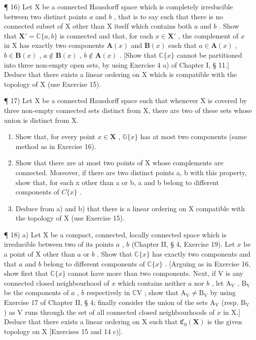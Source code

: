 ¶ 16) Let X be a connected Hausdorff space which is completely irreducible between two distinct points \(a\) and \(b\) , that is to say such that there is no connected subset of X other than X itself which contains both \(a\) and \(b\) . Show that \(\mathbf{X}' = \mathbb{C}\{a, b\}\) is connected and that, for each \(x \in \mathbf{X}'\) , the complement of \(x\) in X has exactly two components \(\mathbf{A}(x)\) and \(\mathbf{B}(x)\) such that \(a \in \mathbf{A}(x)\) , \(b \in \mathbf{B}(x)\) , \(a \notin \mathbf{B}(x)\) , \(b \notin \mathbf{A}(x)\) . {[}Show that \(\mathbb{C}\{x\}\) cannot be partitioned into three non-empty open sets, by using Exercise 4 a) of Chapter I, § 11.{]} Deduce that there exists a linear ordering on X which is compatible with the topology of X (use Exercise 15).

¶ 17) Let X be a connected Hausdorff space such that whenever X is covered by three non-empty connected sets distinct from X, there are two of these sets whose union is distinct from X.

\begin{enumerate}
\def\labelenumi{\alph{enumi})}
\item
  Show that, for every point \(x \in \mathbf{X}\) , \(\mathbb{G}\{x\}\) has at most two components (same method as in Exercise 16).
\item
  Show that there are at most two points of X whose complements are connected. Moreover, if there are two distinct points a, b with this property, show that, for each x other than a or b, a and b belong to different components of \(C\{x\}\) .
\item
  Deduce from a) and b) that there is a linear ordering on X compatible with the topology of X (use Exercise 15).
\end{enumerate}

¶ 18) a) Let X be a compact, connected, locally connected space which is irreducible between two of its points \(a\) , \(b\) (Chapter II, § 4, Exercise 19). Let \(x\) be a point of X other than \(a\) or \(b\) . Show that \(\mathbb{C}\{x\}\) has exactly two components and that \(a\) and \(b\) belong to different components of \(\mathbb{C}\{x\}\) . {[}Arguing as in Exercise 16, show first that \(\mathbb{C}\{x\}\) cannot have more than two components. Next, if V is any connected closed neighbourhood of \(x\) which contains neither \(a\) nor \(b\) , let \(\mathrm{A}_{\mathrm{V}}\) , \(\mathrm{B}_{\mathrm{V}}\) be the components of \(a\) , \(b\) respectively in \(\mathbb{C}\mathrm{V}\) ; show that \(\mathrm{A}_{\mathrm{V}} \neq \mathrm{B}_{\mathrm{V}}\) by using Exercise 17 of Chapter II, § 4; finally consider the union of the sets \(\mathrm{A}_{\mathrm{V}}\) (resp. \(\mathrm{B}_{\mathrm{V}}\) ) as V runs through the set of all connected closed neighbourhoods of \(x\) in X.{]} Deduce that there exists a linear ordering on X such that \(\mathfrak{C}_{0}(\mathbf{X})\) is the given topology on X {[}Exercises 15 and 14 c){]}.

